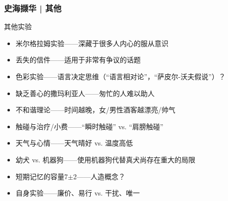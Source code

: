 \begin{frame}
  \frametitle{史海撷华 | 其他}
  \begin{block}{其他实验}
    \begin{itemize}
      \item 米尔格拉姆实验——深藏于很多人内心的服从意识
      \item 丢失的信件——适用于非常有争议的话题
      \item 色彩实验——语言决定思维（“语言相对论”，“萨皮尔-沃夫假说”）？
      \item 缺乏善心的撒玛利亚人——匆忙的人难以助人
      \item 不和谐理论——时间越晚，女/男性酒客越漂亮/帅气
      \item 触碰与治疗/小费——“瞬时触碰” vs. “肩膀触碰”
      \item 天气与心情——天气晴好 vs. 温度高低
      \item 幼犬 vs. 机器狗——使用机器狗代替真犬尚存在重大的局限
      \item 短期记忆的容量7$\pm$2——人造概念？
      \item 自身实验——廉价、易行 vs. 干扰、唯一
    \end{itemize}
  \end{block}
\end{frame}


